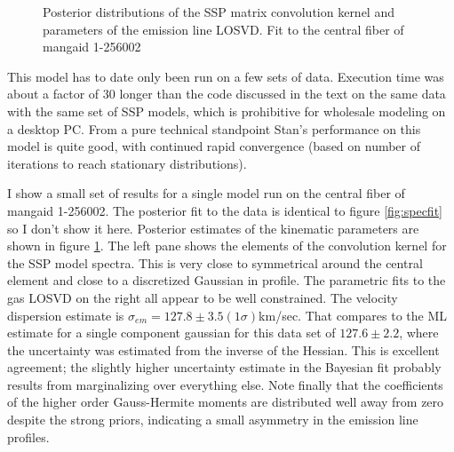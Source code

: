 \documentclass[modern]{aastex62}
\begin{document}
\begin{figure}[ht]
\caption{Posterior distributions of the SSP matrix convolution kernel and parameters of the emission line LOSVD. Fit to the central fiber of mangaid 1-256002}
\label{fig:losvd_1_256002}
\end{figure}

This model has to date only been run on a few sets of data. Execution time was about a factor of 30 longer than the code discussed in the text on the same data with the same set of SSP models, which is prohibitive for wholesale modeling on a desktop PC. From a pure technical standpoint Stan's performance on this model is quite good, with continued rapid convergence (based on number of iterations to reach stationary distributions).

I show a small set of results for a single model run on the central fiber of mangaid 1-256002. The posterior fit to the data is identical to figure \ref{fig:specfit} so I don't show it here. Posterior estimates of the kinematic parameters are shown in figure \ref{fig:losvd_1_256002}. The left pane shows the elements of the convolution kernel for the SSP model spectra. This is very close to symmetrical around the central element and close to a discretized Gaussian in profile. The parametric fits to the gas LOSVD on the right all appear to be well constrained. The velocity dispersion estimate is $\sigma_{em} = 127.8 \pm 3.5 (1 \sigma)$km/sec. That compares to the ML estimate for a single component gaussian for this data set of $127.6 \pm 2.2$, where the uncertainty was estimated from the inverse of the Hessian. This is excellent agreement; the slightly higher uncertainty estimate in the Bayesian fit probably results from marginalizing over everything else. Note finally that the coefficients of the higher order Gauss-Hermite moments are distributed well away from zero despite the strong priors, indicating a small asymmetry in the emission line profiles.
\end{document}
